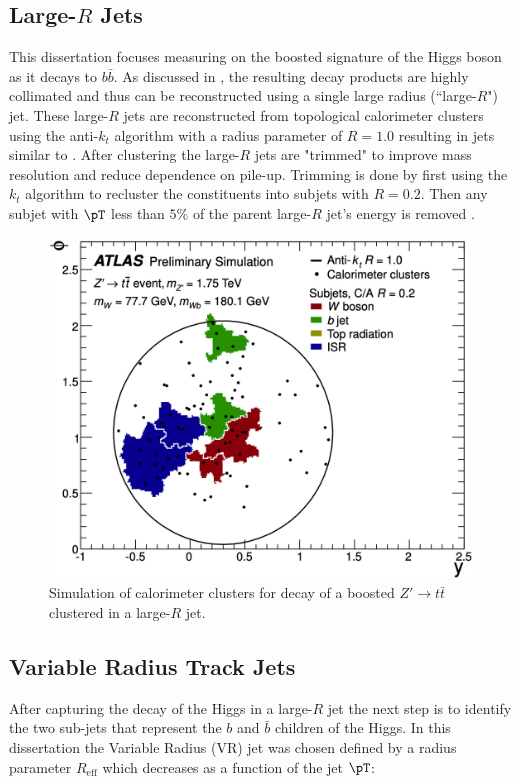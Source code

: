 \subsection{Large-$R$ Jets} \label{sec:objects:fatjet}
This dissertation focuses measuring on the boosted signature of the Higgs boson
as it decays to $b\bar{b}$.  As discussed in , the
resulting decay products are highly collimated and thus can be reconstructed
using a single large radius (``large-$R$") jet.  These large-$R$ jets are
reconstructed from topological calorimeter clusters using the anti-$k_{t}$
algorithm with a radius parameter of $R = 1.0$ resulting in jets similar to
 \cite{Aaboud:2018kfi, Aaboud:2017hdf}. After
clustering the large-$R$ jets are "trimmed" to improve mass resolution and
reduce dependence on pile-up. Trimming is done by first using the $k_{t}$
algorithm to recluster the constituents into subjets with $R=0.2$.  Then any
subjet with $\pT$ less than $5\%$ of the parent large-$R$ jet's energy is
removed \cite{Krohn:2009th}.

\begin{figure}[!htbp]
  \centering
  \includegraphics[width=0.7\linewidth]{figures/objects/large_R_example}
  \caption{\cite{ATLAS-CONF-2014-003} Simulation of calorimeter clusters for decay of a boosted $Z' \rightarrow t\bar{t}$ clustered in a large-$R$ jet.}
  \label{sec:object:large_R_example}
\end{figure}

\subsection{Variable Radius Track Jets} \label {sec:objects:vrjets}

After capturing the decay of the Higgs in a large-$R$ jet the next step is to
identify the two sub-jets that represent the $b$ and $\bar{b}$ children of the
Higgs. In this dissertation the Variable Radius (VR) jet was chosen
\cite{Krohn:2009zg,ATL-PHYS-PUB-2017-010} defined by a radius parameter
$R_{\text{eff}}$ which decreases as a function of the jet $\pT$:

